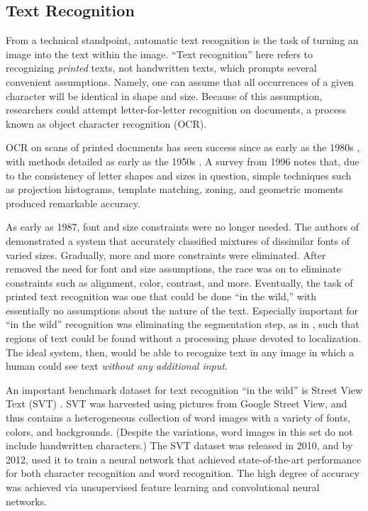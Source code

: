\documentclass[final]{ukthesis}
\begin{document}
\subsection{Text Recognition}
From a technical standpoint, automatic text recognition is the task of turning an image into the text within the image. ``Text recognition'' here refers to recognizing {\em printed} texts, not handwritten texts, which prompts several convenient assumptions. Namely, one can assume that all occurrences of a given character will be identical in shape and size. Because of this assumption, researchers could attempt letter-for-letter recognition on documents, a process known as object character recognition (OCR).

OCR on scans of printed documents has seen success since as early as the 1980s \cite{mantas1986overview,govindan1990character}, with methods detailed as early as the 1950s \cite{glauberman1956character}. A survey from 1996 \cite{trier1996feature} notes that, due to the consistency of letter shapes and sizes in question, simple techniques such as projection histograms, template matching, zoning, and geometric moments produced remarkable accuracy.

As early as 1987, font and size constraints were no longer needed. The authors of \cite{kahan1987recognition} demonstrated a system that accurately classified mixtures of dissimilar fonts of varied sizes. Gradually, more and more constraints were eliminated. After \cite{kahan1987recognition} removed the need for font and size assumptions, the race was on to eliminate constraints such as alignment, color, contrast, and more. Eventually, the task of printed text recognition was one that could be done ``in the wild,'' \cite{smith2007overview,wang2012end,jaderberg2016reading} with essentially no assumptions about the nature of the text. Especially important for ``in the wild'' recognition was eliminating the segmentation step, as in \cite{rusinol2015efficient}, such that regions of text could be found without a processing phase devoted to localization. The ideal system, then, would be able to recognize text in any image in which a human could see text {\em without any additional input}.

An important benchmark dataset for text recognition ``in the wild'' is Street View Text (SVT) \cite{wang2010word}. SVT was harvested using pictures from Google Street View, and thus contains a heterogeneous collection of word images with a variety of fonts, colors, and backgrounds. (Despite the variations, word images in this set do not include handwritten characters.) The SVT dataset was released in 2010, and by 2012, \cite{wang2012end} used it to train a neural network that achieved state-of-the-art performance for both character recognition and word recognition. The high degree of accuracy was achieved via unsupervised feature learning and convolutional neural networks.
\end{document}
